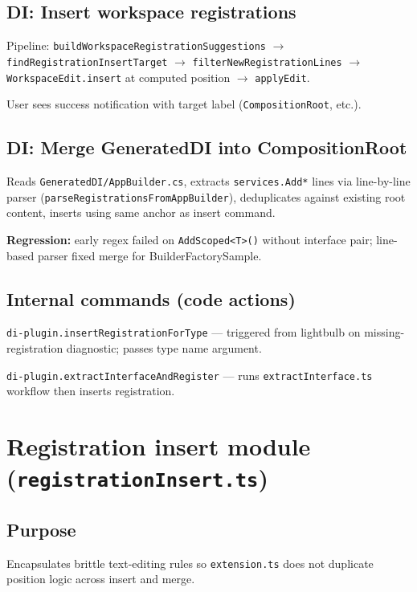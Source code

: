\subsection{DI: Insert workspace registrations}

Pipeline: \texttt{buildWorkspaceRegistrationSuggestions} $\rightarrow$ \texttt{findRegistrationInsertTarget} $\rightarrow$ \texttt{filterNewRegistrationLines} $\rightarrow$ \texttt{WorkspaceEdit.insert} at computed position $\rightarrow$ \texttt{applyEdit}.

User sees success notification with target label (\texttt{CompositionRoot}, etc.).

\subsection{DI: Merge GeneratedDI into CompositionRoot}

Reads \texttt{GeneratedDI/AppBuilder.cs}, extracts \texttt{services.Add*} lines via line-by-line parser (\texttt{parseRegistrationsFromAppBuilder}), deduplicates against existing root content, inserts using same anchor as insert command.

\textbf{Regression:} early regex failed on \texttt{AddScoped<T>()} without interface pair; line-based parser fixed merge for BuilderFactorySample.

\subsection{Internal commands (code actions)}

\texttt{di-plugin.insertRegistrationForType} --- triggered from lightbulb on missing-registration diagnostic; passes type name argument.

\texttt{di-plugin.extractInterfaceAndRegister} --- runs \texttt{extractInterface.ts} workflow then inserts registration.

\section{Registration insert module (\texttt{registrationInsert.ts})}
\label{chap4:registration-insert}

\subsection{Purpose}

Encapsulates brittle text-editing rules so \texttt{extension.ts} does not duplicate position logic across insert and merge.

